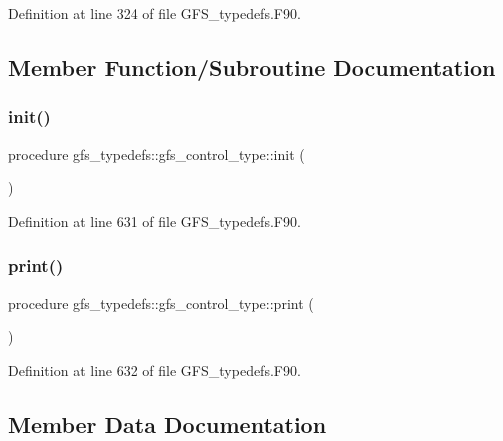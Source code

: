 Definition at line 324 of file G\+F\+S\+\_\+typedefs.\+F90.



\subsection{Member Function/\+Subroutine Documentation}
\mbox{\label{structgfs__typedefs_1_1gfs__control__type_a04bcbc0327a86310791ee04a9289ef0e}} 
\subsubsection{init()}
{\footnotesize\ttfamily procedure gfs\+\_\+typedefs\+::gfs\+\_\+control\+\_\+type\+::init (\begin{DoxyParamCaption}{ }\end{DoxyParamCaption})}



Definition at line 631 of file G\+F\+S\+\_\+typedefs.\+F90.

\mbox{\label{structgfs__typedefs_1_1gfs__control__type_a2247e84875afdd18e3d4e153c15ad61f}} 
\subsubsection{print()}
{\footnotesize\ttfamily procedure gfs\+\_\+typedefs\+::gfs\+\_\+control\+\_\+type\+::print (\begin{DoxyParamCaption}{ }\end{DoxyParamCaption})}



Definition at line 632 of file G\+F\+S\+\_\+typedefs.\+F90.



\subsection{Member Data Documentation}
\mbox{\label{structgfs__typedefs_1_1gfs__control__type_a24e95751937017f7f3efcfdb42bf5718}} 
